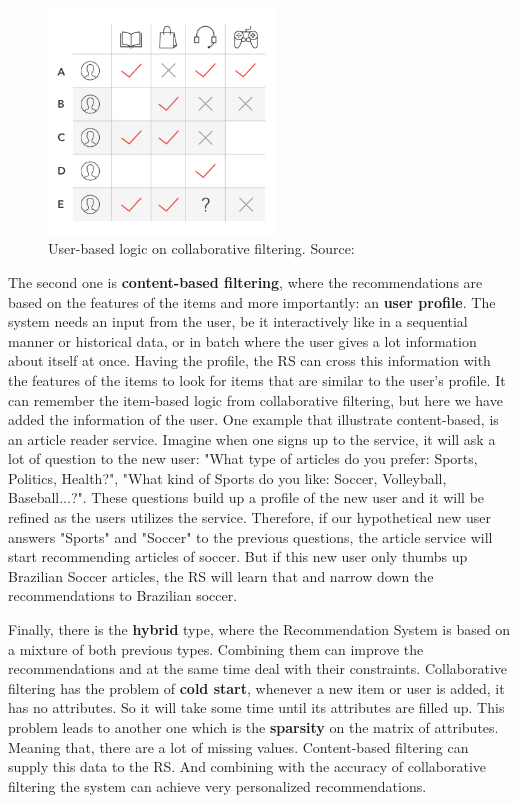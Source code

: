 \begin{figure}[h]
   \centering
   \includegraphics[width=6cm]{fig/ch2-colab-filt-user-user.jpg}
   \caption{User-based logic on collaborative filtering. Source: \cite{delawareai}}
   \label{fig:colab-filt-user-user}
\end{figure}

The second one is \textbf{content-based filtering}, where the recommendations are based on the features of the items and more importantly: an \textbf{user profile}. The system needs an input from the user, be it interactively like in a sequential manner or historical data, or in batch where the user gives a lot information about itself at once. Having the profile, the RS can cross this information with the features of the items to look for items that are similar to the user's profile. It can remember the item-based logic from collaborative filtering, but here we have added the information of the user. One example that illustrate content-based, is an article reader service. Imagine when one signs up to the service, it will ask a lot of question to the new user: "What type of articles do you prefer: Sports, Politics, Health?", "What kind of Sports do you like: Soccer, Volleyball, Baseball...?". These questions build up a profile of the new user and it will be refined as the users utilizes the service. Therefore, if our hypothetical new user answers "Sports" and "Soccer" to the previous questions, the article service will start recommending articles of soccer. But if this new user only thumbs up Brazilian Soccer articles, the RS will learn that and narrow down the recommendations to Brazilian soccer.

Finally, there is the \textbf{hybrid} type, where the Recommendation System is based on a mixture of both previous types. Combining them can improve the recommendations and at the same time deal with their constraints. Collaborative filtering has the problem of \textbf{cold start}, whenever a new item or user is added, it has no attributes. So it will take some time until its attributes are filled up. This problem leads to another one which is the \textbf{sparsity} on the matrix of attributes. Meaning that, there are a lot of missing values. Content-based filtering can supply this data to the RS. And combining with the accuracy of collaborative filtering the system can achieve very personalized recommendations.


